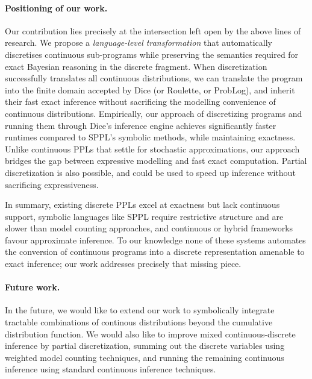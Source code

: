 \paragraph{Positioning of our work.}  
Our contribution lies precisely at the intersection left open by the above lines of research. We propose a \emph{language-level transformation} that automatically discretises continuous sub-programs while preserving the semantics required for exact Bayesian reasoning in the discrete fragment. When discretization successfully translates all continuous distributions, we can translate the program into the finite domain accepted by Dice (or Roulette, or ProbLog), and inherit their fast exact inference without sacrificing the modelling convenience of continuous distributions. 
Empirically, our approach of discretizing programs and running them through Dice's inference engine achieves significantly faster runtimes compared to SPPL's symbolic methods, while maintaining exactness. Unlike continuous PPLs that settle for stochastic approximations, our approach bridges the gap between expressive modelling and fast exact computation. Partial discretization is also possible, and could be used to speed up inference without sacrificing expressiveness.

\medskip  
In summary, existing discrete PPLs excel at exactness but lack continuous support, symbolic languages like SPPL require restrictive structure and are slower than model counting approaches, and continuous or hybrid frameworks favour approximate inference. To our knowledge none of these systems automates the conversion of continuous programs into a discrete representation amenable to exact inference; our work addresses precisely that missing piece.

\paragraph{Future work.}
In the future, we would like to extend our work to symbolically integrate tractable combinations of continous distributions beyond the cumulative distribution function.
We would also like to improve mixed continuous-discrete inference by partial discretization, summing out the discrete variables using weighted model counting techniques, and running the remaining continuous inference using standard continuous inference techniques.
